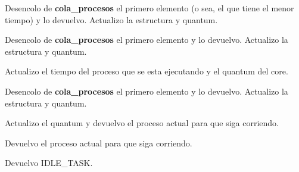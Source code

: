 \begin{algorithmic}

		\State Desencolo de \textbf{cola\_procesos} el primero elemento (o sea, el que tiene el menor tiempo) y lo devuelvo.
		\State Actualizo la estructura y quantum.
	
		\State Desencolo de \textbf{cola\_procesos} el primero elemento y lo devuelvo.
		\State Actualizo la estructura y quantum.

		\State Actualizo el tiempo del proceso que se esta ejecutando y el quantum del core.

			\State Desencolo de \textbf{cola\_procesos} el primero elemento y lo devuelvo.
			\State Actualizo la estructura y quantum.

			\State Actualizo el quantum y devuelvo el proceso actual para que siga corriendo.

		\Else
			\State Devuelvo el proceso actual para que siga corriendo.
		\EndIf

	\Else
		\State Devuelvo IDLE\_TASK.
	\EndIf
\EndFunction	
\end{algorithmic}